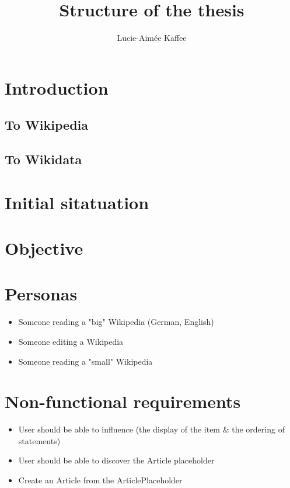 \documentclass[11pt]{article}
\title {{Structure of the thesis}}
\author {Lucie-Aim\'{e}e Kaffee}
\date{}
\begin{document}
\maketitle

\section{Introduction}

\subsection{To Wikipedia}
\subsection{To Wikidata}

\section{Initial sitatuation}

\section{Objective}

\section{Personas}

\begin{itemize}
\item Someone reading a "big" Wikipedia (German, English)
\item Someone editing a Wikipedia
\item Someone reading a "small" Wikipedia 
\end{itemize}

\section{Non-functional requirements}

\begin{itemize}
\item User should be able to influence (the display of the item \& the ordering of statements)
\item User should be able to discover the Article placeholder
\item Create an Article from the ArticlePlaceholder
\end{itemize}
\end{document}
